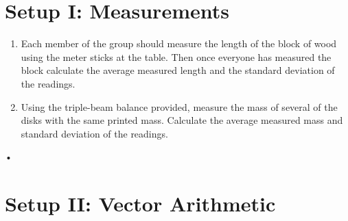 \documentclass[main.tex]{subfiles}
\begin{document}
\section{Setup I: Measurements}
\begin{enumerate}
\item
Each member of the group should measure the length of the block of wood using the meter sticks at the table. Then once everyone has measured the block calculate the average measured length and the standard deviation of the readings.
\item
Using the triple-beam balance provided, measure the mass of several of the disks with the same printed mass. Calculate the average measured mass and standard deviation of the readings.
\end{enumerate}•


\section{Setup II: Vector Arithmetic}
\end{document}
